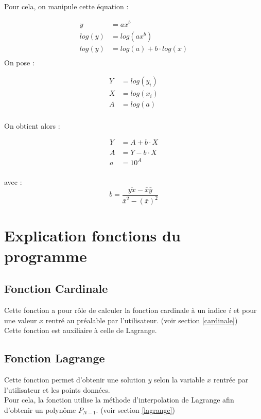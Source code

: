 \documentclass[12pt,french,titlepage]{article}
\begin{document}
	Pour cela, on manipule cette équation :
	
	\begin{align*}
		y&=ax^b\\
		log (y)&=log(ax^b)\\
		log(y)&=log(a)+b\cdot log(x)\\
	\end{align*}
	On pose :
	
	\begin{align*}
	Y&=log(y_i)\\
	X&=log(x_i)\\
	A&=log(a)\\
	\end{align*}
	
	On obtient alors :
	
	\begin{align*}
	Y&=A+b\cdot X\\
	A&=\overline{Y}-b\cdot \overline{X}\\
	a&=10^A\\
	\end{align*}
	
	avec :
	\begin{equation*}
		b=\frac{\overline{yx}-\bar{x}\bar{y}}{\bar{x}^2-(\bar{x})^2}
	\end{equation*}
	
	
	\section{Explication fonctions du programme}
	
	\subsection{Fonction Cardinale}
	
	
	\medskip
	Cette fonction a pour rôle de calculer la fonction cardinale à un indice $i$ et pour une valeur $x$ rentré au préalable par l'utilisateur. (voir section \ref{cardinale}) \\
	Cette fonction est auxiliaire à celle de Lagrange.\\
	\subsection{Fonction Lagrange}
	
	
	\medskip
	Cette fonction permet d'obtenir une solution $y$ selon la variable $x$ rentrée par l'utilisateur et les points données.\\
	Pour cela, la fonction utilise la méthode d'interpolation de Lagrange afin d'obtenir un polynôme $P_{N-1}$. (voir section \ref{lagrange})
\end{document}
